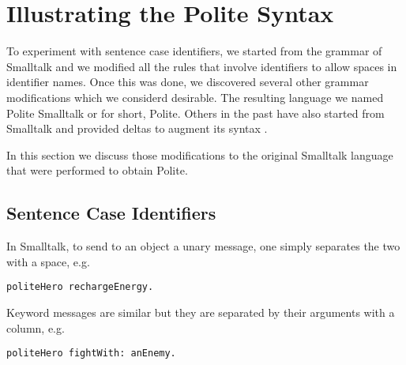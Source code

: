 
\section{Illustrating the Polite Syntax}

To experiment with sentence case identifiers, we started from the grammar of Smalltalk and we modified all the rules that involve identifiers to allow spaces in identifier names. Once this was done, we discovered several other grammar modifications which we considerd desirable. The resulting language we named Polite Smalltalk or for short, Polite. Others in the past have also started from Smalltalk and provided deltas to augment its syntax \cite{Born87}.

In this section we discuss those modifications to the original  Smalltalk language that were performed to obtain Polite.




\newcommand{\comma}{{`,' }}
\newcommand{\plus}{{`+' }}
\newcommand{\code}[1]{{\texttt{#1}}}

\subsection{Sentence Case Identifiers}
In Smalltalk, to send to an object a unary message, one simply separates the two with a space, e.g.

\begin{verbatim} 
politeHero rechargeEnergy.
\end{verbatim}

Keyword messages are similar but they are separated by their arguments with a column, e.g.

\begin{verbatim} 
politeHero fightWith: anEnemy.
\end{verbatim}


